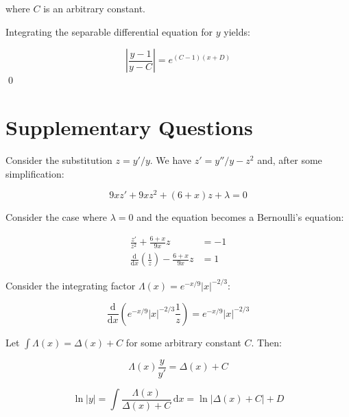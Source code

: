 \documentclass[12pt]{article}
\begin{document}
where $C$ is an arbitrary constant.

Integrating the separable differential equation for $y$ yields:

\begin{equation}
    \left\lvert \frac{y - 1}{y - C} \right\rvert = e^{(C - 1)(x + D)}
\end{equation}
\qed


\pagebreak
\section*{Supplementary Questions}


Consider the substitution $z = y'/y$. We have $z' = y''/y - z^{2}$ and, after some simplification:

\begin{equation}
    9xz' + 9x z^{2} + (6 + x)z + \lambda = 0
\end{equation}

Consider the case where $\lambda = 0$ and the equation becomes a Bernoulli's equation:

\begin{equation}
    \begin{split}
        \frac{z'}{z^{2}} + \frac{6 + x}{9x}z &= -1 \\
        \frac{\mathrm{d}}{\mathrm{d}x} \left( \frac{1}{z} \right) - \frac{6 + x}{9x}z &= 1
    \end{split}
\end{equation}

Consider the integrating factor $\Lambda(x) = e^{-x/9} \left\lvert x \right\rvert^{-2/3}$:

\begin{equation}
    \frac{\mathrm{d}}{\mathrm{d}x} \left( e^{-x/9} \left\lvert x \right\rvert^{-2/3} \frac{1}{z} \right) = e^{-x/9} \left\lvert x \right\rvert^{-2/3}
\end{equation}

Let $\int \Lambda(x) = \Delta(x) + C$ for some arbitrary constant $C$. Then:

\begin{equation}
    \Lambda(x) \frac{y}{y'} = \Delta(x) + C
\end{equation}

\begin{equation}
    \ln{\left\lvert y \right\rvert} = \int \frac{\Lambda(x)}{\Delta(x) + C} \, \mathrm{d}x = \ln{\left\lvert \Delta(x) + C \right\rvert} + D
\end{equation}
\end{document}
